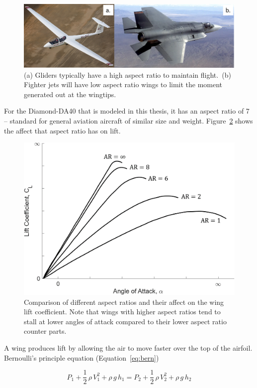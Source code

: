 \begin{figure}[!ht]\label{fig:AR}
    \centering
    \includegraphics[width=0.75\linewidth]{Figures/lowhighar.png}
    \caption{(a) Gliders typically have a high aspect ratio to maintain flight.\ (b) Fighter jets will have low aspect ratio wings to limit the moment generated out at the wingtips.}
\end{figure}

For the Diamond-DA40 that is modeled in this thesis, it has an aspect ratio of 7 {--} standard for general aviation aircraft of similar size and weight. Figure~\ref{fig:ARPLOT} shows the affect that aspect ratio has on lift.

\begin{figure}[!ht]\label{fig:ARPLOT}
    \centering
    \includegraphics[width=0.75\linewidth]{Figures/ARvLift.png}
    \caption{Comparison of different aspect ratios and their affect on the wing lift coefficient. Note that wings with higher aspect ratios tend to stall at lower angles of attack compared to their lower aspect ratio counter parts.}
\end{figure}

A wing produces lift by allowing the air to move faster over the top of the airfoil. Bernoulli's principle equation (Equation~\ref{eq:bern})

\begin{equation}\label{eq:bern}
    P_1 + \frac{1}{2}\, \rho \, V_1^2 + \rho \, g \, h_1 = P_2 + \frac{1}{2}\, \rho \, V_2^2 + \rho \, g \, h_2
\end{equation}

